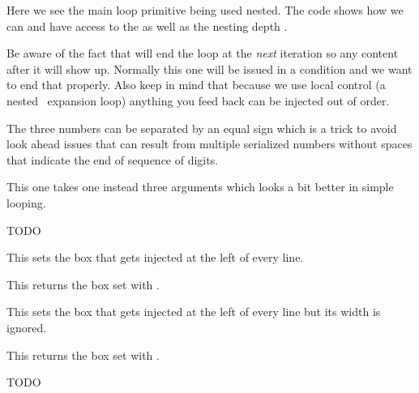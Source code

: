 \typebuffer

Here we see the main loop primitive being used nested. The code shows how we can
 and have access to the  as well as the
nesting depth .

\startpacked \getbuffer \stoppacked

Be aware of the fact that  will end the loop at the {\em next}
iteration so any content after it will show up. Normally this one will be issued
in a condition and we want to end that properly. Also keep in mind that because
we use local control (a nested \TEX\ expansion loop) anything you feed back can
be injected out of order.

The three numbers can be separated by an equal sign which is a trick to avoid
look ahead issues that can result from multiple serialized numbers without spaces
that indicate the end of sequence of digits.

\stopnewprimitive

\startnewprimitive[title={\prm {localcontrolledrepeat}}]

This one takes one instead three arguments which looks a bit better
in simple looping.

\stopnewprimitive

\startnewprimitive[title={\prm {localinterlinepenalty}}]
    TODO
\stopnewprimitive

\startnewprimitive[title={\prm {localleftbox}}]

This sets the box that gets injected at the left of every line.

\stopnewprimitive

\startnewprimitive[title={\prm {localleftboxbox}}]

This returns the box set with .

\stopnewprimitive

\startnewprimitive[title={\prm {localmiddlebox}}]

This sets the box that gets injected at the left of every line but its width
is ignored.

\stopnewprimitive

\startnewprimitive[title={\prm {localmiddleboxbox}}]

This returns the box set with .

\stopnewprimitive

\startnewprimitive[title={\prm {localpretolerance}}]
    TODO
\stopnewprimitive

